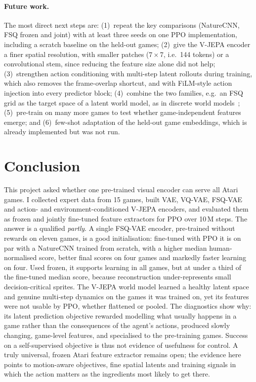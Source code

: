 \documentclass[runningheads]{llncs}
\begin{document}
\paragraph{Future work.}
The most direct next steps are: (1)~repeat the key comparisons (NatureCNN, FSQ frozen and
joint) with at least three seeds on one PPO implementation, including a scratch baseline on
the held-out games; (2)~give the V-JEPA encoder a finer spatial resolution, with smaller
patches ($7\times7$, i.e.\ 144 tokens) or a convolutional stem, since reducing the feature
size alone did not help; (3)~strengthen action conditioning with multi-step latent rollouts during training,
which also removes the frame-overlap shortcut, and with FiLM-style action injection into
every predictor block; (4)~combine the two families, e.g.\ an FSQ grid as the target space
of a latent world model, as in discrete world models~\cite{hafner2021dreamerv2,micheli2023iris};
(5)~pre-train on many more games to test whether game-independent features emerge; and
(6)~few-shot adaptation of the held-out game embeddings, which is already implemented but
was not run.

\section{Conclusion}
\label{sec:conclusion}

This project asked whether one pre-trained visual encoder can serve all Atari games. I
collected expert data from 15 games, built VAE, VQ-VAE, FSQ-VAE and action- and
environment-conditioned V-JEPA encoders, and evaluated them as frozen and jointly
fine-tuned feature extractors for PPO over 10\,M steps. The answer is a qualified
\emph{partly}. A single FSQ-VAE encoder, pre-trained without rewards on eleven games, is a
good initialisation: fine-tuned with PPO it is on par with a NatureCNN trained from scratch,
with a higher median human-normalised score, better final scores on four games and
markedly faster learning on four. Used frozen, it supports learning in all games, but at
under a third of the fine-tuned median score, because reconstruction under-represents small
decision-critical sprites. The V-JEPA world model learned a healthy latent space and
genuine multi-step dynamics on the games it was trained on, yet its features were not
usable by PPO, whether flattened or pooled. The diagnostics show why: its latent prediction
objective rewarded modelling what usually happens in a game rather than the consequences
of the agent's actions, produced slowly changing, game-level features, and specialised to
the pre-training games. Success on a self-supervised objective is thus not evidence of
usefulness for control. A truly universal, frozen Atari feature extractor remains open; the
evidence here points to motion-aware objectives, fine spatial latents and training signals
in which the action matters as the ingredients most likely to get there.
\end{document}
